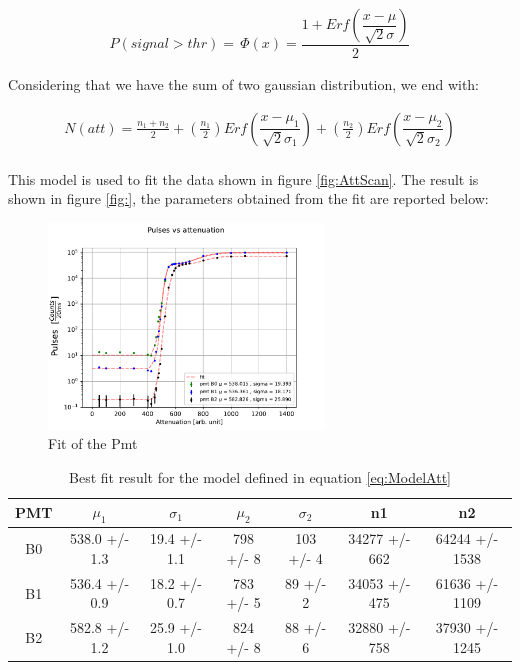 \begin{align*}
P(signal > thr) = \, \Phi(x) = \dfrac{1 + Erf(\dfrac{x - \mu}{\sqrt{2} \sigma })}{2}
\end{align*}

Considering that we have the sum of two gaussian distribution, we end with:

\begin{equation} \label{eq:ModelAtt}
\begin{split}
N(att) = \frac{n_{1} + n_{2}}{2} + (\frac{n_{1}}{2}) Erf(\dfrac{x - \mu_{1}}{\sqrt{2} \sigma_{1} })   + (\frac{n_{2}}{2}) Erf(\dfrac{x - \mu_{2}}{\sqrt{2} \sigma_{2}}) \\
\end{split}
\end{equation}

This model is used to fit the data shown in figure \ref{fig:AttScan}. The result is shown in figure \ref{fig:}, the parameters obtained from the fit are reported below:

\begin{figure}[!ht]
\centering
\includegraphics[width = 0.65\textwidth ]{Analysis/CalibrationPMT/Fit_attenuation.pdf}
\caption{Fit of the Pmt }
\end{figure}

\begin{table}[!ht]
\centering
\begin{tabular}{c|c|c|c|c|c|c}
\hline
 PMT   &  $\mu_{1}$         &  $\sigma_{1}$         & $\mu_{2}$          & $\sigma_{2}$   & n1                & n2                 \\
\hline
 B0    & 538.0 +/- 1.3 & 19.4 +/- 1.1 & 798 +/- 8 & 103 +/- 4 & 34277 +/- 662 & 64244 +/- 1538 \\
 B1    & 536.4 +/- 0.9 & 18.2 +/- 0.7 & 783 +/- 5 & 89 +/- 2  & 34053 +/- 475 & 61636 +/- 1109 \\
 B2    & 582.8 +/- 1.2 & 25.9 +/- 1.0 & 824 +/- 8 & 88 +/- 6  & 32880 +/- 758 & 37930 +/- 1245 \\
\hline
\end{tabular}
\caption{Best fit result for the model defined in equation \ref{eq:ModelAtt}}
\end{table}

